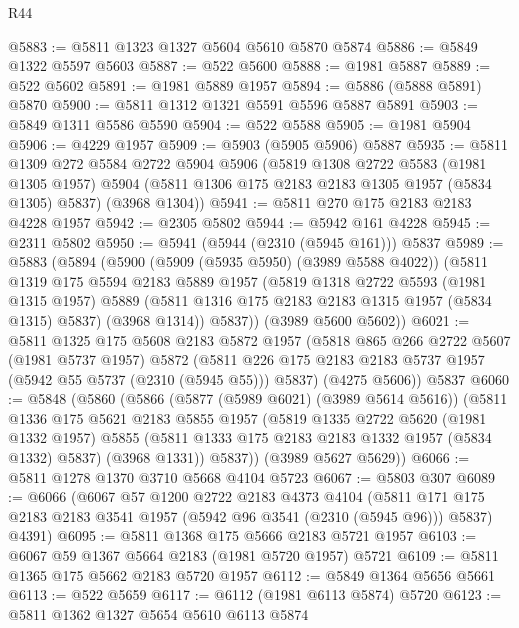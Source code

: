 \begin{lexlean}{R44}
\begin{coremodule}
@5883 := @5811 @1323 @1327 @5604 @5610 @5870 @5874
@5886 := @5849 @1322 @5597 @5603
@5887 := @522 @5600
@5888 := @1981 @5887
@5889 := @522 @5602
@5891 := @1981 @5889 @1957
@5894 := @5886 (@5888 @5891) @5870
@5900 := @5811 @1312 @1321 @5591 @5596 @5887 @5891
@5903 := @5849 @1311 @5586 @5590
@5904 := @522 @5588
@5905 := @1981 @5904
@5906 := @4229 @1957
@5909 := @5903 (@5905 @5906) @5887
@5935 := @5811
    @1309
    @272
    @5584
    @2722
    @5904
    @5906
    (@5819
      @1308
      @2722
      @5583
      (@1981 @1305 @1957)
      @5904
      (@5811 @1306 @175 @2183 @2183 @1305 @1957 (@5834 @1305) @5837)
      (@3968 @1304))
@5941 := @5811 @270 @175 @2183 @2183 @4228 @1957
@5942 := @2305 @5802
@5944 := @5942 @161 @4228
@5945 := @2311 @5802
@5950 := @5941 (@5944 (@2310 (@5945 @161))) @5837
@5989 := @5883
    (@5894
      (@5900
        (@5909 (@5935 @5950) (@3989 @5588 @4022))
        (@5811
          @1319
          @175
          @5594
          @2183
          @5889
          @1957
          (@5819
            @1318
            @2722
            @5593
            (@1981 @1315 @1957)
            @5889
            (@5811 @1316 @175 @2183 @2183 @1315 @1957 (@5834 @1315) @5837)
            (@3968 @1314))
          @5837))
      (@3989 @5600 @5602))
@6021 := @5811
    @1325
    @175
    @5608
    @2183
    @5872
    @1957
    (@5818
      @865
      @266
      @2722
      @5607
      (@1981 @5737 @1957)
      @5872
      (@5811 @226 @175 @2183 @2183 @5737 @1957 (@5942 @55 @5737 (@2310 (@5945 @55))) @5837)
      (@4275 @5606))
    @5837
@6060 := @5848
    (@5860
      (@5866
        (@5877 (@5989 @6021) (@3989 @5614 @5616))
        (@5811
          @1336
          @175
          @5621
          @2183
          @5855
          @1957
          (@5819
            @1335
            @2722
            @5620
            (@1981 @1332 @1957)
            @5855
            (@5811 @1333 @175 @2183 @2183 @1332 @1957 (@5834 @1332) @5837)
            (@3968 @1331))
          @5837))
      (@3989 @5627 @5629))
@6066 := @5811 @1278 @1370 @3710 @5668 @4104 @5723
@6067 := @5803 @307
@6089 := @6066
    (@6067
      @57
      @1200
      @2722
      @2183
      @4373
      @4104
      (@5811 @171 @175 @2183 @2183 @3541 @1957 (@5942 @96 @3541 (@2310 (@5945 @96))) @5837)
      @4391)
@6095 := @5811 @1368 @175 @5666 @2183 @5721 @1957
@6103 := @6067 @59 @1367 @5664 @2183 (@1981 @5720 @1957) @5721
@6109 := @5811 @1365 @175 @5662 @2183 @5720 @1957
@6112 := @5849 @1364 @5656 @5661
@6113 := @522 @5659
@6117 := @6112 (@1981 @6113 @5874) @5720
@6123 := @5811 @1362 @1327 @5654 @5610 @6113 @5874

\end{coremodule}
\end{lexlean}
